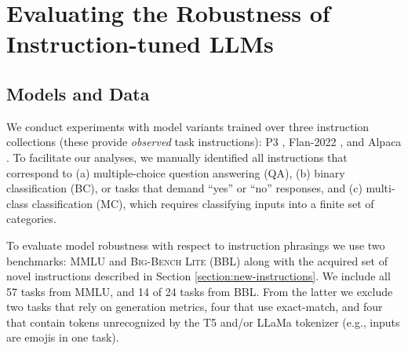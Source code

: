 \section{Evaluating the Robustness of Instruction-tuned LLMs}

\subsection{Models and Data}

We conduct experiments with model variants trained over three instruction collections (these provide \emph{observed} task instructions): P3 \cite{sanh2021multitask}, Flan-2022 \cite{chung2022scaling}, and Alpaca \cite{alpaca}.
To facilitate our analyses, we manually identified all instructions that correspond to (a) multiple-choice question answering (QA), (b) binary classification (BC), or tasks that demand ``yes'' or ``no'' responses, and (c) multi-class classification (MC), which requires classifying inputs into a finite set of categories.

To evaluate model robustness with respect to instruction phrasings we use two benchmarks: \textsc{MMLU} \cite{hendrycks2020measuring} and \textsc{Big-Bench Lite} (\textsc{BBL}) \cite{srivastava2022beyond} along with the acquired set of novel instructions described in Section \ref{section:new-instructions}.
We include all 57 tasks from \textsc{MMLU}, and 14 of 24 tasks from \textsc{BBL}.
From the latter we exclude two tasks that rely on generation metrics, four that use exact-match, and four that contain tokens unrecognized by the T5 and/or LLaMa tokenizer (e.g., inputs are emojis in one task).


